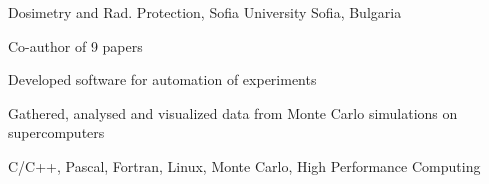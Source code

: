 {Dosimetry and Rad. Protection, Sofia University} {Sofia, Bulgaria}
{
 \item Co-author of 9 papers
 \item Developed software for automation of experiments
}
{ 
 \item Gathered, analysed and visualized data from Monte Carlo simulations on supercomputers
}
{C/C++, Pascal, Fortran, Linux, Monte Carlo, High Performance Computing}

